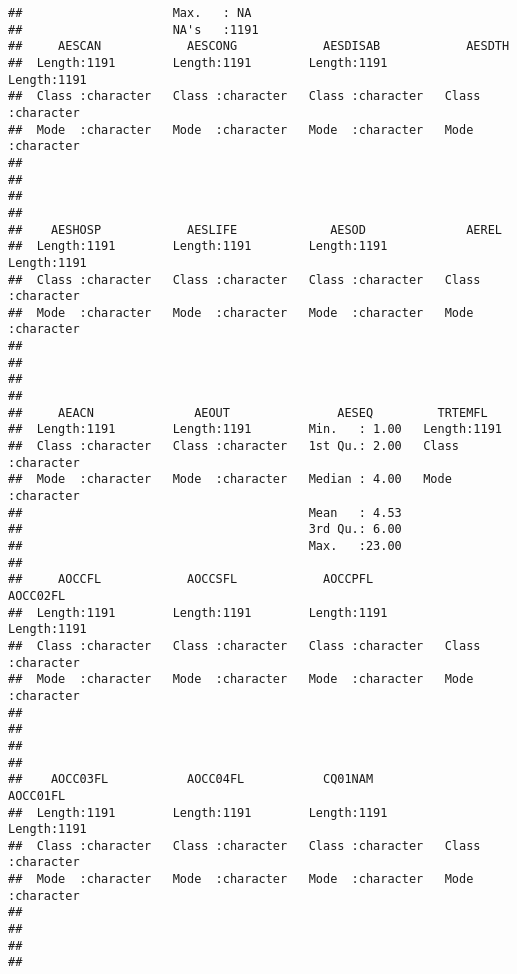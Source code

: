 \documentclass[]{book}
\begin{document}
\begin{verbatim}
##                     Max.   : NA                                         
##                     NA's   :1191                                        
##     AESCAN            AESCONG            AESDISAB            AESDTH         
##  Length:1191        Length:1191        Length:1191        Length:1191       
##  Class :character   Class :character   Class :character   Class :character  
##  Mode  :character   Mode  :character   Mode  :character   Mode  :character  
##                                                                             
##                                                                             
##                                                                             
##                                                                             
##    AESHOSP            AESLIFE             AESOD              AEREL          
##  Length:1191        Length:1191        Length:1191        Length:1191       
##  Class :character   Class :character   Class :character   Class :character  
##  Mode  :character   Mode  :character   Mode  :character   Mode  :character  
##                                                                             
##                                                                             
##                                                                             
##                                                                             
##     AEACN              AEOUT               AESEQ         TRTEMFL         
##  Length:1191        Length:1191        Min.   : 1.00   Length:1191       
##  Class :character   Class :character   1st Qu.: 2.00   Class :character  
##  Mode  :character   Mode  :character   Median : 4.00   Mode  :character  
##                                        Mean   : 4.53                     
##                                        3rd Qu.: 6.00                     
##                                        Max.   :23.00                     
##                                                                          
##     AOCCFL            AOCCSFL            AOCCPFL            AOCC02FL        
##  Length:1191        Length:1191        Length:1191        Length:1191       
##  Class :character   Class :character   Class :character   Class :character  
##  Mode  :character   Mode  :character   Mode  :character   Mode  :character  
##                                                                             
##                                                                             
##                                                                             
##                                                                             
##    AOCC03FL           AOCC04FL           CQ01NAM            AOCC01FL        
##  Length:1191        Length:1191        Length:1191        Length:1191       
##  Class :character   Class :character   Class :character   Class :character  
##  Mode  :character   Mode  :character   Mode  :character   Mode  :character  
##                                                                             
##                                                                             
##                                                                             
## 
\end{verbatim}
\end{document}
